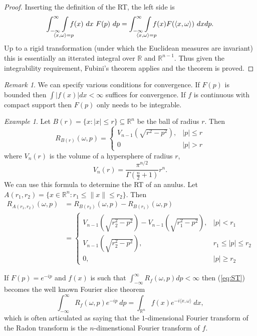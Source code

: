 \documentclass{amsart}
\theoremstyle{remark}
\newtheorem{example}[theorem]{Example}
\newtheorem{remark}[theorem]{Remark}
\numberwithin{equation}{section}
\newcommand{\RR}{\mathbb{R}}
\def\mclimits_#1{\limits_{\mathclap{#1}}}
\begin{document}
\begin{proof}
Inserting the definition of the RT, the left side is
\[
    \int_{-\infty}^\infty \int\mclimits_{\langle x, \omega \rangle = p} f(x) ~dx~ F(p) ~dp 
    = \int_{-\infty}^\infty \int\mclimits_{\langle x, \omega \rangle = p} f(x) F(\langle x, \omega \rangle) ~dx dp.
\]
Up to a rigid transformation (under which the Euclidean measures are invariant) this is essentially an itterated integral over $\RR$ and $\RR^{n-1}$. Thus given the integrability requirement, Fubini's theorem applies and the theorem is proved.
\end{proof}

\begin{remark}
We can specify various conditions for convergence. If $F(p)$ is bounded then $\int |f(x)| dx < \infty$ suffices for convergence. If $f$ is continuous with compact support then $F(p)$ only needs to be integrable.  
\end{remark}

\begin{example}
Let $B(r) = \{x : |x| \leq r\} \subseteq \RR^n$ be the ball of radius $r$. Then 
\[
    R_{B(r)}(\omega, p) = 
    \begin{cases}
        V_{n-1}(\sqrt{r^2 - p^2}), & |p| \leq r \\
        0 & |p| > r
    \end{cases}    
\]
where $V_n(r)$ is the volume of a hypersphere of radius $r$,
\[
    V_n(r) = \frac{\pi^{n/2}}{\Gamma(\frac n2+1)} r^n.
\]
We can use this formula to determine the RT of an anulus. Let $A(r_1, r_2) = \{x \in \RR^n: r_1 \leq \|x\| \leq r_2\}$. Then
\begin{align*}
    R_{A(r_1, r_2)}(\omega, p) 
    &= R_{B(r_2)}(\omega, p) - R_{B(r_1)}(\omega, p) \\
    &= 
    \begin{cases}
        V_{n-1}(\sqrt{r_2^2 - p^2}) - V_{n-1}(\sqrt{r_1^2 - p^2}), & |p| < r_1 \\
        V_{n-1}(\sqrt{r_2^2 - p^2}), & r_1 \leq |p| \leq r_2 \\
        0, & |p| \geq r_2
    \end{cases}
\end{align*}
\end{example}


If $F(p) = e^{-ip}$ and $f(x)$ is such that $\int_{-\infty}^\infty R_f(\omega, p) dp < \infty$ then (\ref{eq:ST}) becomes the well known Fourier slice theorem
\[
    \int_{-\infty}^\infty R_f(\omega, p) e^{-ip} ~dp
    = \int_{\mathbb{R}^n} f(x) e^{-i\langle x, \omega\rangle} ~dx,
\]
which is often articulated as saying that the $1$-dimensional Fourier transform of the Radon transform is the $n$-dimenstional Fourier transform of $f$.
\end{document}
